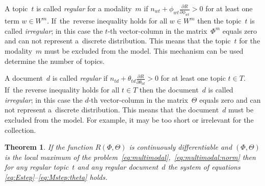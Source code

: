 \documentclass{sig-alternate-2013}
\newtheorem{theorem}{Theorem}
\begin{document}
A topic~$t$ is called \emph{regular} for a modality~$m$
if $n_{wt} + \phi_{wt} \frac{\partial R}{\partial \phi_{wt}} > 0$
for at least one term ${w\in W^m}$.
If~the~reverse inequality holds for all ${w\in W^m}$ then
the topic~$t$ is called \emph{irregular};
in this case the $t$-th vector-column in the matrix~$\Phi^m$ equals zero
and can not represent a~discrete distribution.
This means that the topic~$t$ for the modality~$m$ must be excluded from the model.
This mechanism can be used determine the number of topics.

A document~$d$ is called \emph{regular}
if $n_{td} + \theta_{td} \frac{\partial R}{\partial \theta_{td}} > 0$
for at least one topic ${t\in T}$.
If~the reverse inequality holds for all ${t\in T}$ then
the document~$d$ is called \emph{irregular};
in this case the $d$-th vector-column in the matrix~$\Theta$ equals zero
and can not represent a~discrete distribution.
This means that the document~$d$ must be excluded from the model.
For example, it may be too short or irrelevant for the collection.

\begin{theorem}
\label{th:multimodal}
    If the function $R(\Phi,\Theta)$ is continuously differentiable
    and $(\Phi,\Theta)$ is the local maximum
    of the problem~\eqref{eq:multimodal},~\eqref{eq:multimodal:norm}
    then for any regular topic~$t$ %
    and any regular document~$d$
    the system of equations \eqref{eq:Estep}--\eqref{eq:Mstep:theta} holds.
\end{theorem}
\balancecolumns
\end{document}
